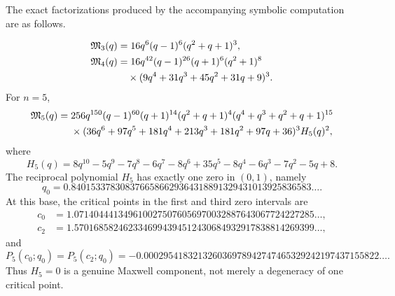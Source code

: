\documentclass[11pt,oneside]{article}
\theoremstyle{definition}
\theoremstyle{remark}
\theoremstyle{plain}
\theoremstyle{definition}
\theoremstyle{remark}
\numberwithin{equation}{section}
\numberwithin{figure}{section}
\numberwithin{table}{section}
\begin{document}
The exact factorizations produced by the accompanying symbolic computation
are as follows.

\begin{align}
 \mathfrak M_3(q)
 &=16q^6(q-1)^6(q^2+q+1)^3,
 \label{eq:M3-exact}\\
 \mathfrak M_4(q)
 &=16q^{42}(q-1)^{26}(q+1)^6(q^2+1)^8\notag\\
 &\quad\times
 (9q^4+31q^3+45q^2+31q+9)^3.
 \label{eq:M4-exact}
\end{align}
For \(n=5\),
\begin{align}
 \mathfrak M_5(q)
 ={}&256q^{150}(q-1)^{60}(q+1)^{14}
 (q^2+q+1)^4
 (q^4+q^3+q^2+q+1)^{15}\notag\\
 &\times
 (36q^6+97q^5+181q^4+213q^3+181q^2+97q+36)^3
 H_5(q)^2,
 \label{eq:M5-exact}
\end{align}
where
\begin{equation}
 H_5(q)=8q^{10}-5q^9-7q^8-6q^7-8q^6+35q^5
       -8q^4-6q^3-7q^2-5q+8.
 \label{eq:H5-polynomial}
\end{equation}
The reciprocal polynomial \(H_5\) has exactly one zero in \((0,1)\), namely
\[
 q_0=0.8401533783083766586629364318891329431013925836583\ldots .
\]
At this base, the critical points in the first and third zero intervals are
\begin{align*}
 c_0&=1.0714044413496100275076056970032887643067724227285\ldots,\\
 c_2&=1.5701685824623346994394512430684932917838814269399\ldots,
\end{align*}
and
\[
 P_5(c_0;q_0)=P_5(c_2;q_0)
 =-0.000295418321326036978942747465329242197437155822\ldots .
\]
Thus \(H_5=0\) is a genuine Maxwell component, not merely a degeneracy of one
critical point.
\end{document}
